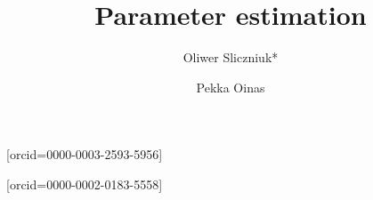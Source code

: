\documentclass[a4paper,fleqn]{cas-dc}
\begin{document}
 

\title[mode=title]{Parameter estimation}                      


\author[1]{Oliwer Sliczniuk*}[orcid=0000-0003-2593-5956]
\cormark[1]

\author[1]{Pekka Oinas}[orcid=0000-0002-0183-5558]


\address[1]{Aalto University, School of Chemical Engineering, Espoo, 02150, Finland}

\end{document}
